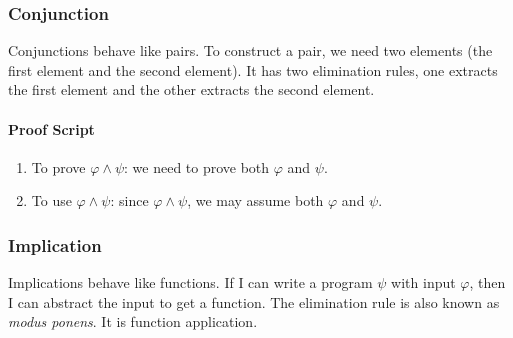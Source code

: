 \documentclass{amsart}
\begin{document}
\subsubsection{Conjunction}
\label{sec:conjunction}

Conjunctions behave like pairs.
To construct a pair, we need two elements (the first element and the second element).
It has two elimination rules, one extracts the first element and the other extracts the second element.

\paragraph{Proof Script}
\begin{enumerate}
\item To prove $\varphi \wedge \psi$: we need to prove both $\varphi$ and $\psi$.
\item To use $\varphi \wedge \psi$: since $\varphi \wedge \psi$, we may assume both $\varphi$ and $\psi$.
\end{enumerate}

\subsubsection{Implication}
\label{sec:implication}

Implications behave like functions.
If I can write a program $\psi$ with input $\varphi$, then I can abstract the input to get a function.
The elimination rule is also known as \emph{modus ponens}.
It is function application.
\end{document}
